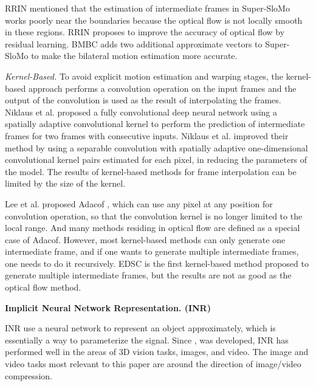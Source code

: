 \documentclass{article}
\begin{document}
RRIN \cite{li2020video} mentioned that the estimation of intermediate frames in Super-SloMo works poorly near the boundaries because the optical flow is not locally smooth in these regions.
RRIN proposes to improve the accuracy of optical flow by residual learning.
BMBC \cite{park2020bmbc} adds two additional approximate vectors to Super-SloMo to make the bilateral motion estimation more accurate.


\textit{Kernel-Based.}
To avoid explicit motion estimation and warping stages, the kernel-based approach performs a convolution operation on the input frames and the output of the convolution is used as the result of interpolating the frames.
Niklaus et al. \cite{niklaus2017video1} proposed a fully convolutional deep neural network using a spatially adaptive convolutional kernel to perform the prediction of intermediate frames for two frames with consecutive inputs.
Niklaus et al. \cite{niklaus2017video2} improved their method by using a separable convolution with spatially adaptive one-dimensional convolutional kernel pairs estimated for each pixel, in reducing the parameters of the model.
The results of kernel-based methods for frame interpolation can be limited by the size of the kernel.

Lee et al. proposed Adacof \cite{lee2020adacof}, which can use any pixel at any position for convolution operation,
so that the convolution kernel is no longer limited to the local range.
And many methods residing in optical flow are defined as a special case of Adacof.
However, most kernel-based methods can only generate one intermediate frame, and if one wants to generate multiple intermediate frames, one needs to do it recursively.
EDSC \cite{cheng2021multiple} is the first kernel-based method proposed to generate multiple intermediate frames, but the results are not as good as the optical flow method.


\textbf{Implicit Neural Network Representation. (INR)}

INR use a neural network to represent an object approximately, which is essentially a way to parameterize the signal.
Since \cite{mildenhall2020nerf}, \cite{sitzmann2020implicit} was developed, INR has performed well in the areas of 3D vision tasks, images, and video.
The image and video tasks most relevant to this paper are around the direction of image/video compression.
\end{document}
